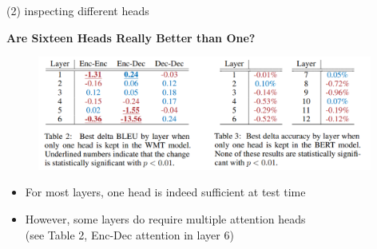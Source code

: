 \begin{frame}{(2) inspecting different heads}

\vfill

\textbf{Are Sixteen Heads Really Better than One?} 

	\begin{figure}
		\centering
		\includegraphics[width = 11cm]{figure/51-diffbleu-acc.png}
	\end{figure}
		
	\begin{itemize}
		\item For most layers, one head is indeed sufficient at test time
		\item However, some layers do require multiple attention heads\\
					(see Table 2, Enc-Dec attention in layer 6)
	\end{itemize}
	
\vfill

\end{frame}


